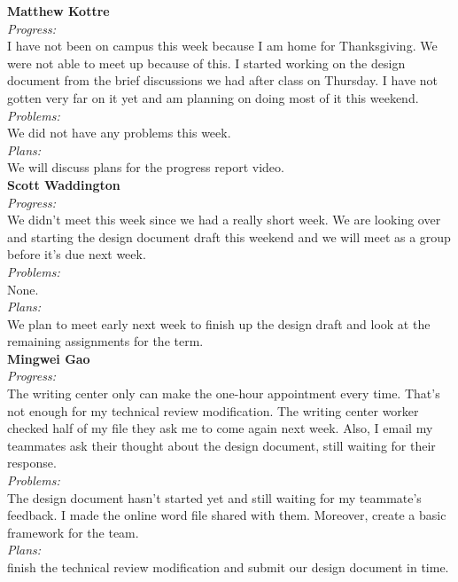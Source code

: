 \noindent\textbf{Matthew Kottre}\\
\noindent\textit{Progress:}\\
I have not been on campus this week because I am home for Thanksgiving. We were not able to meet up because of this. I started working on the design document from the brief discussions we had after class on Thursday. I have not gotten very far on it yet and am planning on doing most of it this weekend.\\

\noindent\textit{Problems:}\\
\noindent We did not have any problems this week.\\

\noindent\textit{Plans:}\\
\noindent We will discuss plans for the progress report video.\\

\noindent\textbf{Scott Waddington}\\
\noindent\textit{Progress:}\\
We didn't meet this week since we had a really short week. We are looking over and starting the design document draft this weekend and we will meet as a group before it's due next week.\\

\noindent\textit{Problems:}\\
\noindent None.\\

\noindent\textit{Plans:}\\
\noindent We plan to meet early next week to finish up the design draft and look at the remaining assignments for the term.\\

\noindent\textbf{Mingwei Gao}\\
\noindent\textit{Progress:}\\
 The writing center only can make the one-hour appointment every time. That's not enough for my technical review modification. The writing center worker checked half of my file they ask me to come again next week. Also, I email my teammates ask their thought about the design document, still waiting for their response.\\

\noindent\textit{Problems:}\\
\noindent The design document hasn't started yet and still waiting for my teammate's feedback. I made the online word file shared with them. Moreover, create a basic framework for the team.\\

\noindent\textit{Plans:}\\
\noindent finish the technical review modification and submit our design document in time.\\